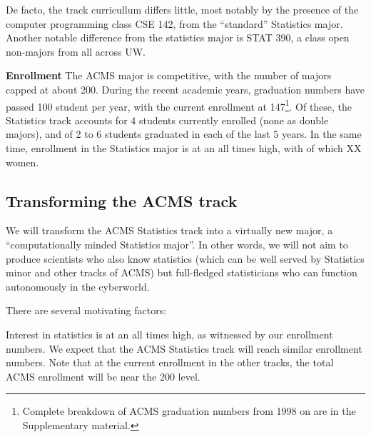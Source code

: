 De facto, the track curricullum differs little, most notably by the
presence of the computer programming class CSE 142, from the
``standard'' Statistics major. Another notable difference from the
statistics major is STAT 390, a class open non-majors from all across UW.

{\bf Enrollment} The ACMS major is competitive, with the number of
majors capped at about 200.  During the recent academic years,
graduation numbers have passed 100 student per year, with the current
enrollment at 147\footnote{Complete breakdown of ACMS graduation
  numbers from 1998 on are in the Supplementary material.}.  Of these,
the Statistics track accounts for 4 students currently enrolled (none
as double majors), and of 2 to 6 students graduated in each of the
last 5 years. In the same time, enrollment in the Statistics major is
at an all times high, with  of which XX women.

\subsection{Transforming the ACMS track}
We will transform the ACMS Statistics track into a virtually new
major, a ``computationally minded Statistics major''. In other words,
we will not aim to produce scientists who also know statistics (which
can be well served by Statistics minor and other tracks of ACMS) but
full-fledged statisticians who can function autonomously in the
cyberworld.

There are several motivating factors:
\bit
\item Interest in statistics is at an all times high, as witnessed by
  our enrollment numbers. We expect that the ACMS Statistics track
  will reach similar enrollment numbers. Note that at the current
  enrollment in the other tracks, the total ACMS enrollment will be
  near the 200 level.

